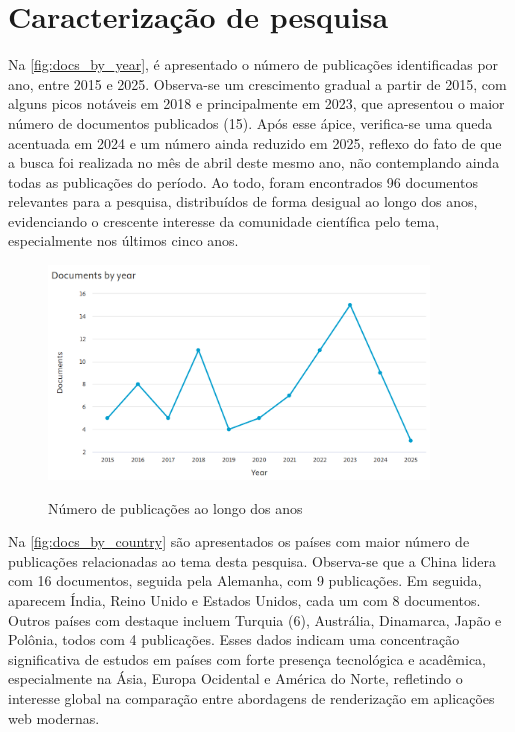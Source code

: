 \section{Caracterização de pesquisa}
\label{section:caracterizacao_pesquisa}
Na \autoref{fig:docs_by_year}, é apresentado o número de publicações identificadas por ano, entre 2015 e 2025. Observa-se um crescimento gradual a partir de 2015, com alguns picos notáveis em 2018 e principalmente em 2023, que apresentou o maior número de documentos publicados (15). Após esse ápice, verifica-se uma queda acentuada em 2024 e um número ainda reduzido em 2025, reflexo do fato de que a busca foi realizada no mês de abril deste mesmo ano, não contemplando ainda todas as publicações do período. Ao todo, foram encontrados 96 documentos relevantes para a pesquisa, distribuídos de forma desigual ao longo dos anos, evidenciando o crescente interesse da comunidade científica pelo tema, especialmente nos últimos cinco anos.

\begin{figure}[H]
    \centering
    \caption{Número de publicações ao longo dos anos}
    \includegraphics[width=0.9\textwidth]{media/docs_by_year.png}
    \label{fig:docs_by_year}
\end{figure}

Na \autoref{fig:docs_by_country} são apresentados os países com maior número de publicações relacionadas ao tema desta pesquisa. Observa-se que a China lidera com 16 documentos, seguida pela Alemanha, com 9 publicações. Em seguida, aparecem Índia, Reino Unido e Estados Unidos, cada um com 8 documentos. Outros países com destaque incluem Turquia (6), Austrália, Dinamarca, Japão e Polônia, todos com 4 publicações. Esses dados indicam uma concentração significativa de estudos em países com forte presença tecnológica e acadêmica, especialmente na Ásia, Europa Ocidental e América do Norte, refletindo o interesse global na comparação entre abordagens de renderização em aplicações web modernas.

